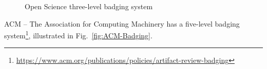\documentclass[journal,twoside]{IEEEtran}
\begin{document}
\begin{figure}[hbt]
	\centering
	\caption{Open Science three-level badging system}\label{Fig:OpenScienceBadges}
\end{figure}

ACM -- The Association for Computing Machinery has a five-level badging system\footnote{ \url{https://www.acm.org/publications/policies/artifact-review-badging}}, illustrated in Fig.~\ref{fig:ACM-Badging}.
\end{document}
